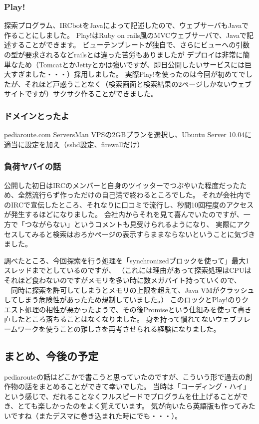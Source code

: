 \documentclass{jsarticle}
\begin{document}
\subsubsection{Play!}
探索プログラム、IRCbotをJavaによって記述したので、ウェブサーバもJavaで作ることにしました。
Play!はRuby on rails風のMVCウェブサーバで、Javaで記述することができます。
ビューテンプレートが独自で、さらにビューへの引数の型が要求されるなどrailsとは違った苦労もありましたが
デプロイは非常に簡単なため（TomcatとかJettyとかは強いですが、即日公開したいサービスには巨大すぎました・・・）採用しました。
実際Play!を使ったのは今回が初めてでしたが、それほど戸惑うことなく（検索画面と検索結果の2ページしかないウェブサイトですが）サクサク作ることができました。

\subsubsection{ドメインとったよ}
pediaroute.com
ServersMan VPSの2GBプランを選択し、Ubuntu Server 10.04に適当に設定を加え（sshd設定、firewallだけ）

\subsubsection{負荷ヤバイの話}
公開した初日はIRCのメンバーと自身のツイッターでつぶやいた程度だったため、全然流行らず作っただけの自己満で終わるところでした。
それが会社内でのIRCで宣伝したところ、それなりに口コミで流行し、秒間10回程度のアクセスが発生するほどになりました。
会社内からそれを見て喜んでいたのですが、一方で「つながらない」というコメントも見受けられるようになり、
実際にアクセスしてみると検索はおろかページの表示すらままならないということに気づきました。

調べたところ、今回探索を行う処理を「synchronizedブロックを使って」最大1スレッドまでとしているのですが、
（これには理由があって探索処理はCPUはそれほど食わないのですがメモリを多い時に数メガバイト持っていくので、
　同時に探索を許可してしまうとメモリの上限を超えて、Java VMがクラッシュしてしまう危険性があったため規制していました。）
このロックとPlay!のりクエスト処理の相性が悪かったようで、その後Promiseという仕組みを使って書き直したところ落ちることはなくなりました。
身を持って慣れてないウェブフレームワークを使うことの難しさを再考させられる経験になりました。

\subsection{まとめ、今後の予定}
pediarouteの話はどこかで書こうと思っていたのですが、こういう形で過去の創作物の話をまとめることができて幸いでした。
当時は「コーディング・ハイ」という感じで、だれることなくフルスピードでプログラムを仕上げることができ、とても楽しかったのをよく覚えています。
気が向いたら英語版も作ってみたいですね（またデスマに巻き込まれた時にでも・・・）。
\end{document}
